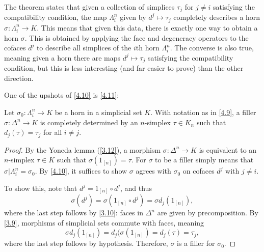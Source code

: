 The theorem states that given a collection of simplices $\tau _j$ for $j\neq i$ satisfying the compatibility condition, the map $\Lambda _i^n$ given by $d^j\mapsto \tau _j$ completely describes a horn $\sigma : \Lambda _i^n \to K$. This means that given this data, there is exactly one way to obtain a horn $\sigma $. This is obtained by applying the face and degeneracy operators to the cofaces $d^j$ to describe all simplices of the $i$th horn $\Lambda _i^n$. The converse is also true, meaning given a horn there are maps $d^j\mapsto \tau _j$ satisfying the compatibility condition, but this is less interesting (and far easier to prove) than the other direction.

One of the upshots of \cref{4.10} is \cref{4.11}:

\begin{corollary}\label{4.11}
	Let $\sigma _0: \Lambda _i^n \to K$ be a horn in a simplicial set $K$. With notation as in \cref{4.9}, a filler $\sigma : \Delta ^n \to K$ is completely determined by an $n$-simplex $\tau \in K_n$ such that $d_j(\tau)=\tau _j$ for all $i\neq j$.
\end{corollary}
\begin{proof}
	By the Yoneda lemma (\cref{3.12}), a morphism $\sigma :\Delta ^n \to K$ is equivalent to an $n$-simplex $\tau \in K$ such that $\sigma (1_{[n]} )=\tau $. For $\sigma $ to be a filler simply means that $\sigma |\Lambda _i^n=\sigma _0$. By \cref{4.10}, it suffices to show $\sigma $ agrees with $\sigma _0$ on cofaces $d^j$ with $j\neq i$.

	To show this, note that $d^j=1_{[n]} \circ d^j$, and thus
	\[
		\sigma (d^j)=\sigma (1_{[n]} \circ d^j)=\sigma d_j(1_{[n]} ),
	\]
	where the last step follows by \cref{3.10}: faces in $\Delta ^n$ are given by precomposition. By \cref{3.9}, morphisms of simplicial sets commute with faces, meaning
	\[
		\sigma d_j(1_{[n]} )=d_j(\sigma (1_{[n]} )=d_j(\tau )=\tau _j,
	\]
	where the last step follows by hypothesis. Therefore, $\sigma $ is a filler for $\sigma _0$.
\end{proof}
